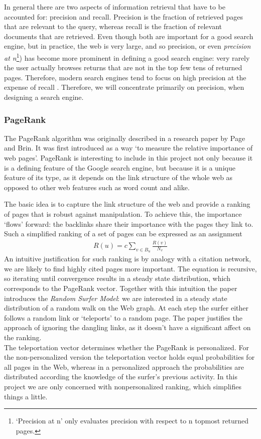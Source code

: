 \documentclass[12pt,twoside,notitlepage]{report}
\begin{document}
In general there are two aspects of information retrieval that have to be
accounted for: precision and recall. Precision is the fraction of retrieved pages that
are relevant to the query, whereas recall is the fraction of relevant
documents that are retrieved. Even though both are important for a good search
engine, but in practice, the web is very large, and so precision, or even
\textit{precision at n}\footnote{`Precision at n' only evaluates precision with respect to
n topmost returned pages.}) has become
more prominent in defining a good search engine: very rarely the user actually
browses returns that are not in the top few tens of returned pages. Therefore, 
modern search engines tend to focus on high precision at the expense of recall
\cite{GOOGLE}. Therefore, we will concentrate primarily on precision, when
designing a search engine.

\subsubsection*{PageRank}
The PageRank algorithm was originally described in a research paper
by Page and Brin\cite{pagerank}. It was first introduced as a way `to measure
the relative importance of web pages'. PageRank is interesting to include in
this project not only because it is a defining feature of the Google search
engine, but because it is a unique feature of its type, as it depends on the link
structure of the whole web as opposed to other  web features such as word count
and alike.

The basic idea is to capture the link structure of the web and provide a
ranking of pages that is robust against manipulation. To achieve this, the
importance `flows' forward: the backlinks share their importance with the pages
they link to. Such a simplified ranking of a set of pages can be expressed as an assignment
\begin{gather}
  R(u)=c\sum_{v\in B_u}\frac{R(v)}{N_v}
\end{gather}
An intuitive justification for such ranking is by analogy with a citation
network, we are likely to find highly cited pages more important.
The equation is recursive, so iterating until convergence results in a steady
state distribution, which corresponds to the PageRank vector.
Together with this intuition the paper introduces the \textit{Random Surfer
Model}: we are interested in a steady state distribution of a random walk on
the Web graph. At each step the surfer either follows a random link or
`teleports' to a random page. The paper justifies the approach of ignoring the
dangling links, as it doesn't have a significant affect on the ranking. \\
The teleportation vector determines whether the PageRank is personalized. For
the non-personalized version the teleportation vector holds equal probabilities
for all pages in the Web, whereas in a personalized approach the probabilities
are distributed according the knowledge of the surfer's previous activity. In
this project we are only concerned with nonpersonalized ranking, which
simplifies things a little.
\end{document}
